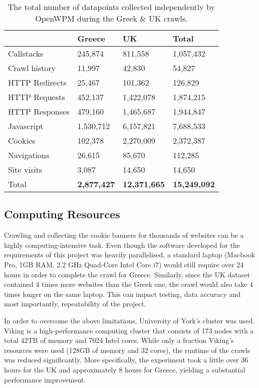 \documentclass[../main.tex]{subfiles}
\begin{document}
\begin{table}[ht]
    \centering
    \begin{tabular}{@{}llll@{}}
        \toprule
                       & Greece             & UK         & Total        \\ \midrule
        Callstacks     & 245,874            & 811,558    & 1,057,432    \\
        Crawl history  & 11,997             & 42,830     & 54,827       \\
        HTTP Redirects & 25,467             & 101,362    & 126,829      \\
        HTTP Requests  & 452,137            & 1,422,078  & 1,874,215    \\
        HTTP Responses & 479,160            & 1,465,687  & 1,944,847    \\
        Javascript     & 1,530,712          & 6,157,821  & 7,688,533    \\
        Cookies        & 102,378            & 2,270,009  & 2,372,387    \\
        Navigations    & 26,615             & 85,670     & 112,285      \\
        Site visits    & 3,087              & 14,650     & 14,650       \\
        Total          & \textbf{2,877,427} & \textbf{12,371,665} & \textbf{15,249,092} \\ \bottomrule
    \end{tabular}
    \caption{The total number of datapoints collected independently by OpenWPM during the Greek \& UK crawls.}
    \label{tab:data_open_wpm}
\end{table}

\subsection{Computing Resources}
Crawling and collecting the cookie banners for thousands of websites can be a highly computing-intensive task. Even though the software developed for the requirements of this project was heavily parallelised, a standard laptop (Macbook Pro, 1GB RAM, 2.2 GHz Quad-Core Intel Core i7) would still require over 24 hours in order to complete the crawl for Greece. Similarly, since the UK dataset contained 4 times more websites than the Greek one, the crawl would also take 4 times longer on the same laptop. This can impact testing, data accuracy and most importantly, repeatability of the project. 

In order to overcome the above limitations, University of York’s  \cite{viking} cluster was used. Viking is a high-performance computing cluster that consists of 173 nodes with a total 42TB of memory and 7024 Intel cores. While only a fraction Viking’s resources were used (128GB of memory and 32 cores), the runtime of the crawls was reduced significantly. More specifically, the experiment took a little over 36 hours for the UK and approximately 8 hours for Greece, yielding a substantial performance improvement.
\end{document}
